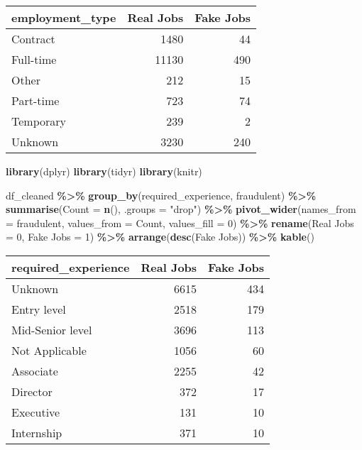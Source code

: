 \documentclass[
]{article}
\newenvironment{Shaded}{\begin{snugshade}}{\end{snugshade}}
\newcommand{\AttributeTok}[1]{\textcolor[rgb]{0.13,0.29,0.53}{#1}}
\newcommand{\DecValTok}[1]{\textcolor[rgb]{0.00,0.00,0.81}{#1}}
\newcommand{\FunctionTok}[1]{\textcolor[rgb]{0.13,0.29,0.53}{\textbf{#1}}}
\newcommand{\NormalTok}[1]{#1}
\newcommand{\OtherTok}[1]{\textcolor[rgb]{0.56,0.35,0.01}{#1}}
\newcommand{\SpecialCharTok}[1]{\textcolor[rgb]{0.81,0.36,0.00}{\textbf{#1}}}
\newcommand{\StringTok}[1]{\textcolor[rgb]{0.31,0.60,0.02}{#1}}
\begin{document}
\begin{longtable}[]{@{}lrr@{}}
\toprule\noalign{}
employment\_type & Real Jobs & Fake Jobs \\
\midrule\noalign{}
\endhead
\bottomrule\noalign{}
\endlastfoot
Contract & 1480 & 44 \\
Full-time & 11130 & 490 \\
Other & 212 & 15 \\
Part-time & 723 & 74 \\
Temporary & 239 & 2 \\
Unknown & 3230 & 240 \\
\end{longtable}

\begin{Shaded}
\begin{Highlighting}[]
\FunctionTok{library}\NormalTok{(dplyr)}
\FunctionTok{library}\NormalTok{(tidyr)}
\FunctionTok{library}\NormalTok{(knitr)}

\NormalTok{df\_cleaned }\SpecialCharTok{\%\textgreater{}\%}
  \FunctionTok{group\_by}\NormalTok{(required\_experience, fraudulent) }\SpecialCharTok{\%\textgreater{}\%}
  \FunctionTok{summarise}\NormalTok{(}\AttributeTok{Count =} \FunctionTok{n}\NormalTok{(), }\AttributeTok{.groups =} \StringTok{"drop"}\NormalTok{) }\SpecialCharTok{\%\textgreater{}\%}
  \FunctionTok{pivot\_wider}\NormalTok{(}\AttributeTok{names\_from =}\NormalTok{ fraudulent, }\AttributeTok{values\_from =}\NormalTok{ Count, }\AttributeTok{values\_fill =} \DecValTok{0}\NormalTok{) }\SpecialCharTok{\%\textgreater{}\%}
  \FunctionTok{rename}\NormalTok{(}\StringTok{\textasciigrave{}}\AttributeTok{Real Jobs}\StringTok{\textasciigrave{}} \OtherTok{=} \StringTok{\textasciigrave{}}\AttributeTok{0}\StringTok{\textasciigrave{}}\NormalTok{, }\StringTok{\textasciigrave{}}\AttributeTok{Fake Jobs}\StringTok{\textasciigrave{}} \OtherTok{=} \StringTok{\textasciigrave{}}\AttributeTok{1}\StringTok{\textasciigrave{}}\NormalTok{) }\SpecialCharTok{\%\textgreater{}\%}
  \FunctionTok{arrange}\NormalTok{(}\FunctionTok{desc}\NormalTok{(}\StringTok{\textasciigrave{}}\AttributeTok{Fake Jobs}\StringTok{\textasciigrave{}}\NormalTok{)) }\SpecialCharTok{\%\textgreater{}\%}
  \FunctionTok{kable}\NormalTok{()}
\end{Highlighting}
\end{Shaded}

\begin{longtable}[]{@{}lrr@{}}
\toprule\noalign{}
required\_experience & Real Jobs & Fake Jobs \\
\midrule\noalign{}
\endhead
\bottomrule\noalign{}
\endlastfoot
Unknown & 6615 & 434 \\
Entry level & 2518 & 179 \\
Mid-Senior level & 3696 & 113 \\
Not Applicable & 1056 & 60 \\
Associate & 2255 & 42 \\
Director & 372 & 17 \\
Executive & 131 & 10 \\
Internship & 371 & 10 \\
\end{longtable}
\end{document}
